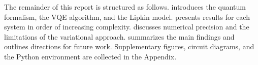 The remainder of this report is structured as follows.  introduces the quantum formalism, the VQE algorithm, and the Lipkin model.  presents results for each system in order of increasing complexity.  discusses numerical precision and the limitations of the variational approach.  summarizes the main findings and outlines directions for future work. Supplementary figures, circuit diagrams, and the Python environment are collected in the Appendix.